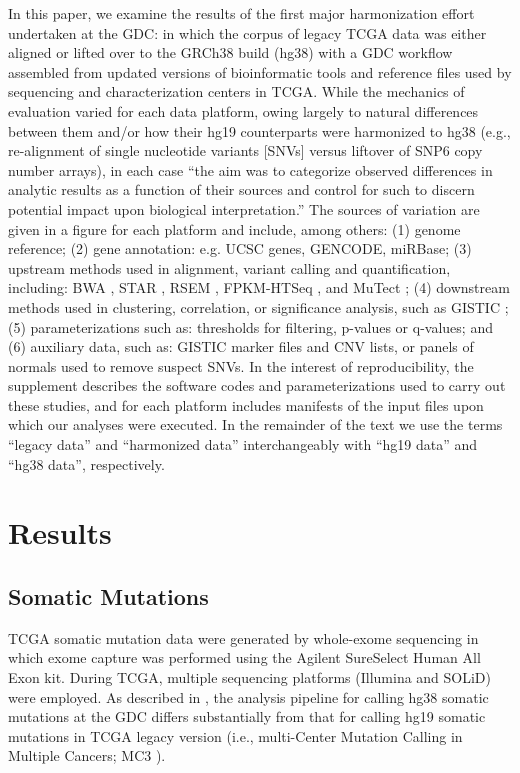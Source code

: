 In this paper, we examine the results of the first major harmonization effort undertaken at the GDC: in which the corpus of legacy TCGA data was either aligned or lifted over to the GRCh38 build (hg38) with a GDC workflow assembled from updated versions of bioinformatic tools and reference files used by sequencing and characterization centers in TCGA. While the mechanics of evaluation varied for each data platform, owing largely to natural differences between them and/or how their hg19 counterparts were harmonized to hg38 (e.g., re-alignment of single nucleotide variants [SNVs] versus liftover of SNP6 copy number arrays), in each case \enquote{the aim was to categorize observed differences in analytic results as a function of their sources and control for such to discern potential impact upon biological interpretation.} The sources of variation are given in a figure for each platform and include, among others: (1) genome reference; (2) gene annotation: e.g. UCSC genes, GENCODE, miRBase; (3) upstream methods used in alignment, variant calling and quantification, including: BWA \cite{lih_durbinr:BWAShortRead2009}, STAR \cite{dobina_gingerastr:STARUltrafast2013}, RSEM \cite{lib_deweycn:RSEMAccurate2011}, FPKM-HTSeq \cite{anderss_huberw:HTSeqPython2015}, and MuTect \cite{cibulskisk_getzg:SensitiveDetection2013}; (4) downstream methods used in clustering, correlation, or significance analysis, such as GISTIC \cite{mermelch_getzg:GISTIC2Facilitates2011}; (5) parameterizations such as: thresholds for filtering, p-values or q-values; and (6) auxiliary data, such as: GISTIC marker files and CNV lists, or panels of normals used to remove suspect SNVs. In the interest of reproducibility, the supplement describes the software codes and parameterizations used to carry out these studies, and for each platform includes manifests of the input files upon which our analyses were executed. In the remainder of the text we use the terms ``legacy data'' and ``harmonized data'' interchangeably with ``hg19 data'' and ``hg38 data'', respectively.


\section{Results}

\subsection{Somatic Mutations}
TCGA somatic mutation data were generated by whole-exome sequencing in which exome capture was performed using the Agilent SureSelect Human All Exon kit. During TCGA, multiple sequencing platforms (Illumina and SOLiD) were employed. As described in , the analysis pipeline for calling hg38 somatic mutations at the GDC differs substantially from that for calling hg19 somatic mutations in TCGA legacy version (i.e., multi-Center Mutation Calling in Multiple Cancers; MC3 \cite{ellrottk_tcga:MC3MutationCalling2018}).


